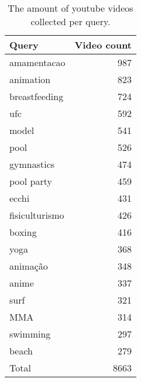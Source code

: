 \begin{table}
\centering
\caption{The amount of youtube videos collected per query.}
\begin{tabular}{l|r} 
Query  & \multicolumn{1}{l}{Video count}  \\ 
\hline
amamentacao    & 987                               \\ 
\hline
animation      & 823                               \\ 
\hline
breastfeeding  & 724                               \\ 
\hline
ufc            & 592                               \\ 
\hline
model          & 541                               \\ 
\hline
pool           & 526                               \\ 
\hline
gymnastics     & 474                               \\ 
\hline
pool party     & 459                               \\ 
\hline
ecchi          & 431                               \\ 
\hline
fisiculturismo & 426                               \\ 
\hline
boxing         & 416                               \\ 
\hline
yoga           & 368                               \\ 
\hline
animação       & 348                               \\ 
\hline
anime          & 337                               \\ 
\hline
surf           & 321                               \\ 
\hline
MMA            & 314                               \\ 
\hline
swimming       & 297                               \\ 
\hline
beach          & 279                               \\ 
\hline
Total          & 8663                              \\
\end{tabular}
\label{tab:non-yt-count}
\end{table}

